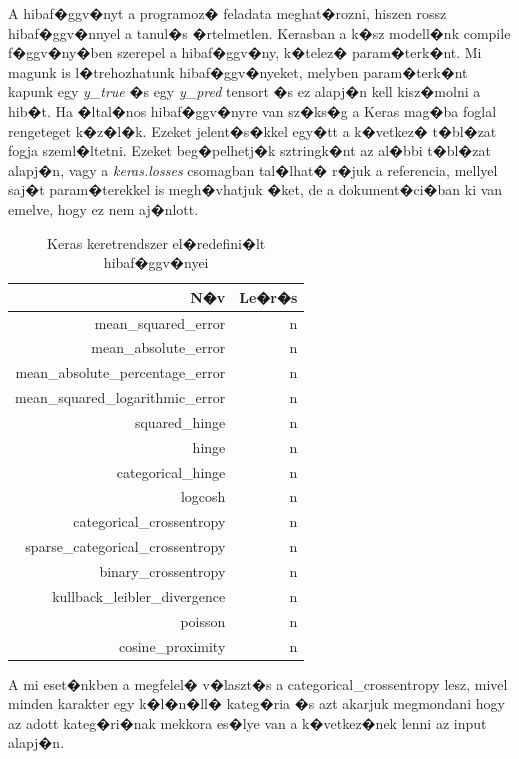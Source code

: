 \documentclass[12pt]{report}
\theoremstyle{definition}
\begin{document}
A hibaf�ggv�nyt a programoz� feladata meghat�rozni, hiszen rossz hibaf�ggv�nnyel a tanul�s �rtelmetlen.
Kerasban a k�sz modell�nk compile f�ggv�ny�ben szerepel a hibaf�ggv�ny, k�telez� param�terk�nt. Mi magunk is l�trehozhatunk hibaf�ggv�nyeket, melyben param�terk�nt kapunk egy \textit{y\_true} �s egy \textit{y\_pred} tensort �s ez alapj�n kell kisz�molni a hib�t.
Ha �ltal�nos hibaf�ggv�nyre van sz�ks�g a Keras mag�ba foglal rengeteget k�z�l�k. Ezeket jelent�s�kkel egy�tt a k�vetkez� t�bl�zat fogja szeml�ltetni. Ezeket beg�pelhetj�k sztringk�nt az al�bbi t�bl�zat alapj�n, vagy a \textit{keras.losses} csomagban tal�lhat� r�juk a referencia, mellyel saj�t param�terekkel is megh�vhatjuk �ket, de a dokument�ci�ban ki van emelve, hogy ez nem aj�nlott.
\begin{table}[!h]\label{loss}
	\caption{Keras keretrendszer el�redefini�lt hibaf�ggv�nyei}
	\begin{center}
		\begin{tabular}{r|r}
			N�v&Le�r�s\\
			\hline\hline
			mean\_squared\_error&n\\
			mean\_absolute\_error&n\\
			mean\_absolute\_percentage\_error&n\\
			mean\_squared\_logarithmic\_error&n\\
			squared\_hinge&n\\
			hinge&n\\
			categorical\_hinge&n\\
			logcosh&n\\
			categorical\_crossentropy&n\\
			sparse\_categorical\_crossentropy&n\\
			binary\_crossentropy&n\\
			kullback\_leibler\_divergence&n\\
			poisson&n\\
			cosine\_proximity&n\\
		\end{tabular}
	\end{center}
\end{table}

A mi eset�nkben a megfelel� v�laszt�s a categorical\_crossentropy lesz, mivel minden karakter egy k�l�n�ll� kateg�ria �s azt akarjuk megmondani hogy az adott kateg�ri�nak mekkora es�lye van a k�vetkez�nek lenni az input alapj�n.
\end{document}
